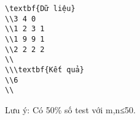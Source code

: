 \begin{verbatim}
\textbf{Dữ liệu}
\\3 4 0
\\1 2 3 1
\\1 9 9 1
\\2 2 2 2	
\\
\\\textbf{Kết quả}
\\6
\\\end{verbatim}

   Lưu ý: Có 50\% số test với m,n≤50.